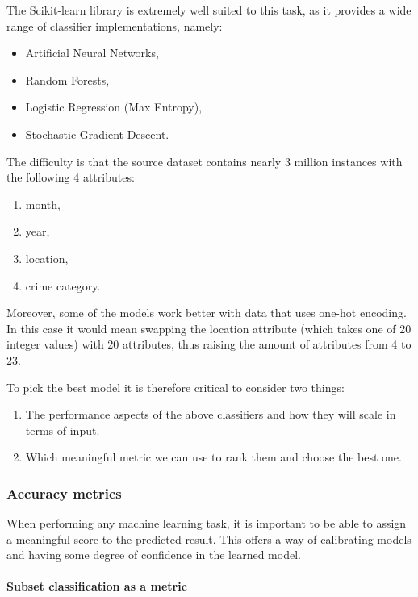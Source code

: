 \documentclass{article}
\begin{document}
	The Scikit-learn library is extremely well suited to this task, as it provides a wide range of classifier implementations, namely:

	\begin{itemize}
		\item Artificial Neural Networks,
		\item Random Forests,
		\item Logistic Regression (Max Entropy),
		\item Stochastic Gradient Descent.
	\end{itemize}

	The difficulty is that the source dataset contains nearly 3 million instances with the following 4 attributes:

	\begin{enumerate}
		\item month,
		\item year,
		\item location,
		\item crime category.
	\end{enumerate}

	Moreover, some of the models work better with data that uses one-hot encoding. In this case it would mean swapping the location attribute (which takes one of 20 integer values) with 20 attributes, thus raising the amount of attributes from 4 to 23.

	To pick the best model it is therefore critical to consider two things:

	\begin{enumerate}
		\item The performance aspects of the above classifiers and how they will scale in terms of input.
		\item Which meaningful metric we can use to rank them and choose the best one.
	\end{enumerate}

	\subsubsection{Accuracy metrics}

	When performing any machine learning task, it is important to be able to assign a meaningful score to the predicted result. This offers a way of calibrating models and having some degree of confidence in the learned model.

	\paragraph{Subset classification as a metric}
\end{document}
